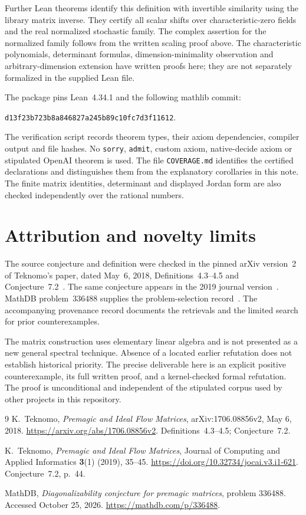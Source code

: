 \documentclass[11pt]{article}
\theoremstyle{remark}\newtheorem{remark}[theorem]{Remark}
\begin{document}
Further Lean theorems identify this definition with invertible similarity
using the library matrix inverse. They certify all scalar shifts over
characteristic-zero fields and the real normalized stochastic family.
The complex assertion for the normalized family follows from the written
scaling proof above. The characteristic polynomials, determinant formulas,
dimension-minimality observation and arbitrary-dimension extension have
written proofs here; they are not separately formalized in the supplied
Lean file.

The package pins Lean~4.34.1 and the following mathlib commit:
\begin{center}
\texttt{d13f23b723b8a846827a245b89c10fc7d3f11612}.
\end{center}
The verification script records theorem types, their axiom dependencies,
compiler output and file hashes. No \texttt{sorry}, \texttt{admit},
custom axiom, native-decide axiom or stipulated OpenAI theorem is used.
The file \texttt{COVERAGE.md} identifies the certified declarations and
distinguishes them from the explanatory corollaries in this note.
The finite matrix identities, determinant and displayed Jordan form
are also checked independently over the rational numbers.

\section{Attribution and novelty limits}
The source conjecture and definition were checked in the pinned
arXiv version~2 of Teknomo's paper, dated May~6, 2018,
Definitions~4.3--4.5 and Conjecture~7.2~\cite{Teknomo}.
The same conjecture appears in the 2019 journal version~\cite{Journal}.
MathDB problem~336488 supplies the problem-selection record~\cite{MathDB}.
The accompanying provenance record documents the retrievals and the
limited search for prior counterexamples.

The matrix construction uses elementary linear algebra and is not
presented as a new general spectral technique. Absence of a located
earlier refutation does not establish historical priority. The precise
deliverable here is an explicit positive counterexample, its full
written proof, and a kernel-checked formal refutation. The proof is
unconditional and independent of the stipulated corpus used by other
projects in this repository.

\begin{thebibliography}{9}
K.~Teknomo, \emph{Premagic and Ideal Flow Matrices},
arXiv:1706.08856v2, May 6, 2018.
\url{https://arxiv.org/abs/1706.08856v2}.
Definitions~4.3--4.5; Conjecture~7.2.

K.~Teknomo, \emph{Premagic and Ideal Flow Matrices},
Journal of Computing and Applied Informatics \textbf{3}(1) (2019), 35--45.
\url{https://doi.org/10.32734/jocai.v3.i1-621}.
Conjecture~7.2, p.~44.

MathDB, \emph{Diagonalizability conjecture for premagic matrices},
problem 336488. Accessed October 25, 2026.
\url{https://mathdb.com/p/336488}.
\end{thebibliography}
\end{document}
